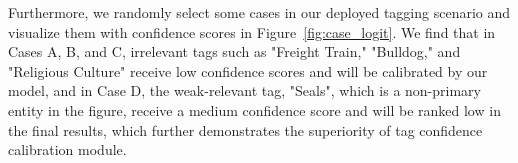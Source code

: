 Furthermore, we randomly select some cases in our deployed tagging scenario and visualize them with confidence scores in Figure~\ref{fig:case_logit}. 
We find that in Cases A, B, and C, irrelevant tags such as "Freight Train," "Bulldog," and "Religious Culture" receive low confidence scores and will be calibrated by our model, and in Case D, the weak-relevant tag, "Seals", which is a non-primary entity in the figure, receive a medium confidence score and will be ranked low in the final results, which further demonstrates the superiority of tag confidence calibration module.







